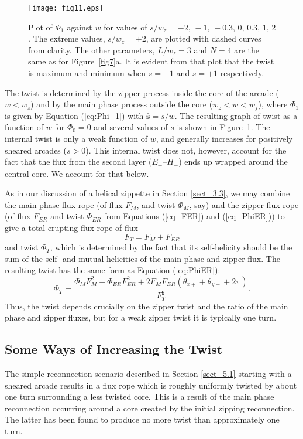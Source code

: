 \documentclass[10pt,namedreferneces]{SolarPhysics}
\begin{document}
\begin{article}
\begin{figure}[h]
{\centering
 \texttt{[image: fig11.eps]}
\caption{Plot of $\Phi_1$  against $w$ for values of $s/w_z=-2,\,-1,\,-0.3,\,0,\,0.3,\,1,\,2$.  The extreme values, $s/w_z=\pm2$, are plotted with dashed curves from clarity.  
The other parameters, $L/w_z=3$ and $N=4$ are the same as for Figure\ \ref{fig7}a.  It is evident from that plot that the twist is maximum and minimum when $s=-1$ and $s=+1$ respectively.}
\label{fig:fig11}}
\end{figure}
The twist is determined by the zipper process inside the core of the arcade ($w<w_z$) and by the main phase process outside the core ($w_z<w<w_f$), where $\Phi_1$ is given by Equation  (\ref{eq:Phi_1}) with ${\bm\bar s}=s/w$. The resulting graph of twist as a function of $w$ for $\Phi_0=0$ and several values of $s$ is shown in Figure\ \ref{fig:fig11}.  The internal twist is only a weak function of $w$, and generally increases for positively sheared arcades ($s>0$).  This internal twist does not, however, account for the fact that the flux from the second layer ($E_+$--$H_-$) ends up wrapped around the central core.  We account for that below.

As in our discussion of a helical zippette in Section \ref{sect_3.3}, we may combine the main phase flux rope (of flux $F_M$, and twist $\Phi_M$, say) and the zipper flux rope (of flux $F_{ER}$ and twist $\Phi_{ER}$ from Equations (\ref{eq_FER}) and (\ref{eq_PhiER})) to give a total erupting flux rope of flux 
\begin{equation}
F_{T}=F_M+F_{ER}
\end{equation}
and twist $\Phi_{T}$, which is determined by the fact that its self-helicity should be the sum of the self- and mutual helicities of the main phase and zipper flux.
The resulting twist has the same form as Equation (\ref{eq:PhiER}):
\begin{equation}
\Phi_{T}=\frac{\Phi_{M}F_M^2+\Phi_{ER}F_{ER}^2+2F_MF_{ER}(\theta_{x+} + \theta_{y-}+2\pi)}{F^2_{T}}.
\end{equation}
Thus, the twist depends crucially on the zipper twist and the ratio of the main phase and zipper fluxes, but for a weak zipper twist it is typically one turn.

\subsection{\bf Some Ways of Increasing the Twist}
\label{sect_5.2}

The simple reconnection scenario described in Section \ref{sect_5.1} starting with a sheared arcade results in a flux rope which is roughly uniformly twisted by about one turn surrounding a less twisted core.  This is a result of the main phase reconnection occurring around a core created by the initial zipping reconnection. The latter has been found to produce no more twist than approximately one turn.  


\end{article}
\end{document}
